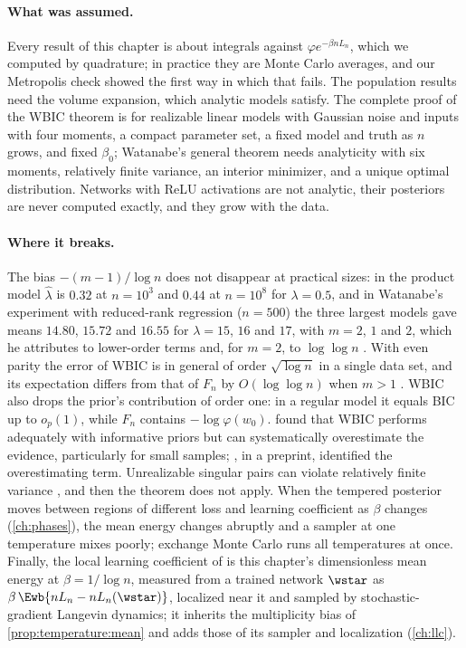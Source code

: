 \begin{refsection}
\paragraph{What was assumed.} Every result of this chapter is about integrals against $\varphi e^{-\beta nL_n}$, which we computed by quadrature; in practice they are Monte Carlo averages, and our Metropolis check showed the first way in which that fails. The population results need the volume expansion, which analytic models satisfy. The complete proof of the WBIC theorem is for realizable linear models with Gaussian noise and inputs with four moments, a compact parameter set, a fixed model and truth as $n$ grows, and fixed $\beta_0$; Watanabe's general theorem needs analyticity with six moments, relatively finite variance, an interior minimizer, and a unique optimal distribution. Networks with ReLU activations are not analytic, their posteriors are never computed exactly, and they grow with the data.

\paragraph{Where it breaks.} The bias $-(m-1)/\log n$ does not disappear at practical sizes: in the product model $\hat\lambda$ is $0.32$ at $n=10^3$ and $0.44$ at $n=10^8$ for $\lambda=0.5$, and in Watanabe's experiment with reduced-rank regression ($n=500$) the three largest models gave means $14.80$, $15.72$ and $16.55$ for $\lambda=15$, $16$ and $17$, with $m=2$, $1$ and $2$, which he attributes to lower-order terms and, for $m=2$, to $\log\log n$ \parencite[Table~3 and \S6.2]{Watanabe2013}. With even parity the error of WBIC is in general of order $\sqrt{\log n}$ in a single data set, and its expectation differs from that of $F_n$ by $O(\log\log n)$ when $m>1$ \parencite[eq.~(32)]{Watanabe2013}. WBIC also drops the prior's contribution of order one: in a regular model it equals BIC up to $o_p(1)$, while $F_n$ contains $-\log\varphi(w_0)$. \Textcite{FrielEtAl2017} found that WBIC performs adequately with informative priors but can systematically overestimate the evidence, particularly for small samples; \textcite{Imai2019b}, in a preprint, identified the overestimating term. Unrealizable singular pairs can violate relatively finite variance \parencite{Watanabe2010d}, and then the theorem does not apply. When the tempered posterior moves between regions of different loss and learning coefficient as $\beta$ changes (\cref{ch:phases}), the mean energy changes abruptly and a sampler at one temperature mixes poorly; exchange Monte Carlo \parencite{HukushimaNemoto1996} runs all temperatures at once. Finally, the local learning coefficient of \textcite{LauEtAl2025} is this chapter's dimensionless mean energy at $\beta=1/\log n$, measured from a trained network $\wstar$ as $\beta\,\Ewb{nL_n-nL_n(\wstar)}$, localized near it and sampled by stochastic-gradient Langevin dynamics; it inherits the multiplicity bias of \cref{prop:temperature:mean} and adds those of its sampler and localization (\cref{ch:llc}).


\end{refsection}
